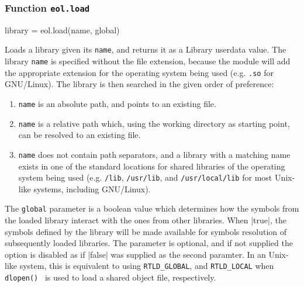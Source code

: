 

\subsubsection{Function \texttt{eol.load}}
	\label{sec:eol-api-load}

\begin{luacode}
  library = eol.load(name, global)
\end{luacode}

Loads a library given its \texttt{name}, and returns it as a \textsf{Library}
userdata value. The library \texttt{name} is specified without the file
extension, because the module will add the appropriate extension for the
operating system being used (e.g. \texttt{.so} for GNU/Linux). The library is
then searched in the given order of preference:

\begin{enumerate}

	\item \texttt{name} is an absolute path, and points to an existing file.

	\item \texttt{name} is a relative path which, using the working directory as
	starting point, can be resolved to an existing file.

	\item \texttt{name} does not contain path separators, and a library with
	a matching name exists in one of the standard locations for shared libraries
	of the operating system being used (e.g. \texttt{/lib}, \texttt{/usr/lib},
	and \texttt{/usr/local/lib} for most Unix-like systems, including
	GNU/Linux).

\end{enumerate}

The \texttt{global} parameter is a boolean value which determines how the
symbols from the loaded library interact with the ones from other libraries.
When \Mlua|true|, the symbols defined by the library will be made available
for symbols resolution of subsequently loaded libraries. The parameter is
optional, and if not supplied the option is disabled as if \Mlua|false| was
supplied as the second paramter. In an Unix-like system, this is equivalent to
using \texttt{RTLD\_GLOBAL}, and \texttt{RTLD\_LOCAL} when
\texttt{dlopen()}~\cite{opengroup-dlopen} is used to load a shared object file,
respectively.


